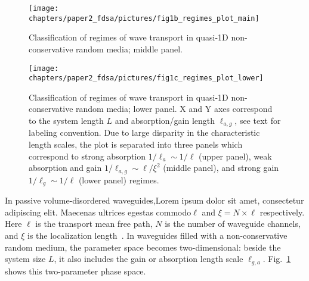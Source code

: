 \begin{figure}
\hskip -0.1cm
\centerline{\texttt{[image: chapters/paper2\_fdsa/pictures/fig1b\_regimes\_plot\_main]}}
\caption[Classification of regimes of wave transport in quasi-1D non-conservative random media; middle panel.]{Classification of regimes of wave transport in quasi-1D non-conservative random media; middle panel.}
\end{figure}

\begin{figure}
\vskip -0.6cm
\centerline{\texttt{[image: chapters/paper2\_fdsa/pictures/fig1c\_regimes\_plot\_lower]}}
\vskip -0.2cm
\caption[Classification of regimes of wave transport in quasi-1D non-conservative random media; lower panel.]{\label{fig:phase_space} Classification of regimes of wave transport in quasi-1D non-conservative random media; lower panel. X and Y axes correspond to the system length $L$ and absorption/gain length $\ell_{a,g}$, see text for labeling convention. Due to large disparity in the characteristic length scales, the plot is separated into three panels which correspond to strong absorption $1/\ell_a\sim 1/\ell$ (upper panel), weak absorption and gain $1/\ell_{a,g}\sim \ell/\xi^2$ (middle panel), and strong gain $1/\ell_g\sim 1/\ell$ (lower panel) regimes. }
\end{figure}

In passive volume-disordered waveguides,Lorem ipsum dolor sit amet, consectetur adipiscing elit. Maecenas ultrices egestas commodo$\ell$ and $\xi=N\times\ell$ respectively. Here $\ell$ is the transport mean free path, $N$ is the number of waveguide channels, and $\xi$ is the localization length~\cite{1997_Beenakker}. In waveguides filled with a non-conservative random medium, the parameter space becomes two-dimensional: beside the system size $L$, it also includes the gain or absorption length scale $\ell_{g,a}$. Fig.~\ref{fig:phase_space} shows this two-parameter phase space.

